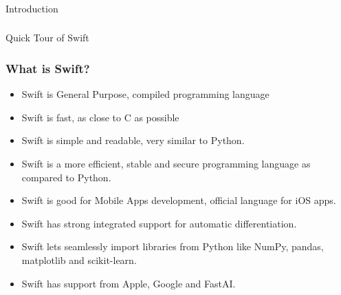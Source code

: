 \begin{frame}[fragile]\frametitle{}
\begin{center}
{\Large Introduction}
\end{center}
\end{frame}



\begin{frame}[fragile]\frametitle{}
\begin{center}
{\Large Quick Tour of Swift}
\end{center}
\end{frame}

\begin{frame} \frametitle{What is Swift?}
\begin{itemize}
\item Swift is General Purpose, compiled programming language
\item Swift is fast, as close to C as possible
\item Swift is simple and readable, very similar to Python. 
\item Swift is a more efficient, stable and secure programming language as compared to Python.
\item Swift is good for Mobile Apps development, official language for iOS apps.
\item Swift has strong integrated support for automatic differentiation.
\item Swift lets seamlessly import libraries from Python like NumPy, pandas, matplotlib and scikit-learn. 
\item Swift has support from Apple, Google and FastAI.
\end{itemize}
\end{frame}

